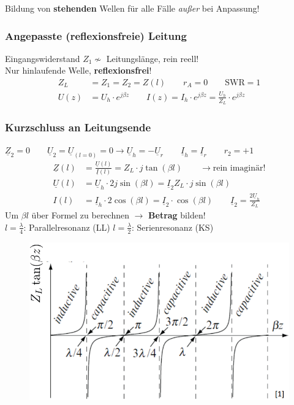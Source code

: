 Bildung von \textbf{stehenden} Wellen für alle Fälle \textit{außer} bei Anpassung!

\subsubsection{Angepasste (reflexionsfreie) Leitung}
Eingangswiderstand $ Z_1\nsim$ Leitungslänge, rein reell!\\
Nur hinlaufende Welle, \textbf{reflexionsfrei}!
\begin{align*}
	Z_L          & = Z_1 = Z_2 = Z(l) \qquad
	r_A          =0 \qquad 
	\mathrm{SWR} = 1  \\
	U(z)         & = U_h\cdot e ^{j\beta z}  \qquad           
	I(z)         = I_h \cdot e^{j\beta z} = \frac{U_h}{Z_L}\cdot e^{j\beta z}
\end{align*}

\subsubsection{Kurzschluss an Leitungsende}
$ \underline{Z}_2 = 0 \qquad \underline{U}_2 = \underline{U}_{(l=0)} = 0 \rightarrow \underline{U}_h = - \underline{U}_r \qquad \underline{I}_h = \underline{I}_r \qquad r_2 = +1$
\begin{align*}
	\underline{Z}(l)         & = \frac{\underline{U}(l)}{\underline{I}(l)} =  Z_L\cdot j\tan(\beta l)        \qquad \rightarrow \text{rein imaginär!}                      \\
	\underline{U}(l) & =  \underline{U}_h  \cdot 2j\sin(\beta l) = \underline{I}_2 Z_L \cdot j\sin(\beta l)\\
	I(l)         & = \underline{I}_h \cdot 2 \cos(\beta l) =\underline{I}_2 \cdot \cos(\beta l) \qquad \underline{I}_2 =\frac{2\underline{U}_h}{Z_L}
\end{align*}
Um $ \beta l $ über Formel zu berechnen $ \rightarrow $ \textbf{Betrag} bilden!\\

$ l=\frac{\lambda}{4} $: Parallelresonanz (LL) \quad $ l=\frac{\lambda}{2} $: Serienresonanz (KS)
\begin{figure}[H]
	\centering
	\includegraphics[width=0.6\columnwidth]{Figures/Kurzgeschlossene_Leitung_diagramm.png}
\end{figure}


